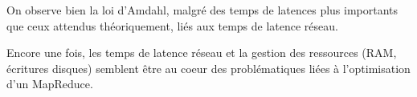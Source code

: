 \documentclass[11pt,a4paper]{article}
\begin{document}
On observe bien la loi d'Amdahl, malgré des temps de latences plus importants que ceux attendus théoriquement, liés aux temps de latence réseau.

Encore une fois, les temps de latence réseau et la gestion des ressources (RAM, écritures disques) semblent être au coeur des problématiques liées à l'optimisation d'un MapReduce.
\end{document}
